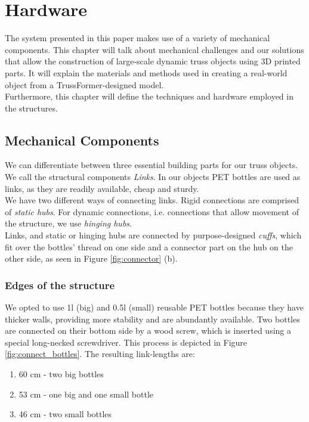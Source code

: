 \chapter{Hardware}\label{ch:hardware}
The system presented in this paper makes use of a variety of mechanical components. This chapter will talk about mechanical challenges and our solutions that allow the construction of large-scale dynamic truss objects using 3D printed parts. It will explain the materials and methods used in creating a real-world object from a TrussFormer-designed model.\\
Furthermore, this chapter will define the techniques and hardware employed in the structures.

\section{Mechanical Components}
We can differentiate between three essential building parts for our truss objects. We call the structural components \textit{Links}. In our objects PET bottles are used as links, as they are readily available, cheap and sturdy.\\
We have two different ways of connecting links. Rigid connections are comprised of \textit{static hubs}. For dynamic connections, i.e. connections that allow movement of the structure, we use \textit{hinging hubs}.\\
Links, and static or hinging hubs are connected by purpose-designed \textit{cuffs}, which fit over the bottles' thread on one side and a connector part on the hub on the other side, as seen in Figure \ref{fig:connector} (b).

\subsection{Edges of the structure}
We opted to use 1l (big) and 0.5l (small) reusable PET bottles because they have thicker walls, providing more stability and are abundantly available. Two bottles are connected on their bottom side by a wood screw, which is inserted using a special long-necked screwdriver. This process is depicted in Figure \ref{fig:connect_bottles}. The resulting link-lengths are:
\begin{enumerate}
\item 60 cm - two big bottles
\item 53 cm - one big and one small bottle
\item 46 cm - two small bottles
\end{enumerate}

